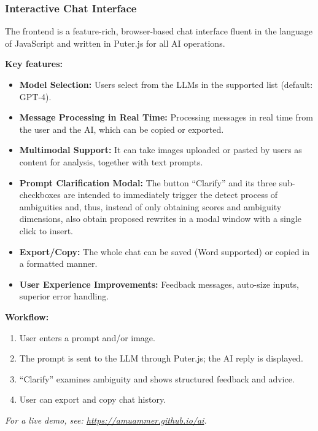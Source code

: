 \documentclass[conference]{IEEEtran}
\begin{document}
\subsubsection{Interactive Chat Interface}
The frontend is a feature-rich, browser-based chat interface fluent in the language of JavaScript and written in Puter.js for all AI operations.

\textbf{Key features:}
\begin{itemize}
    \item \textbf{Model Selection:} Users select from the LLMs in the supported list (default: GPT-4).
    \item \textbf{Message Processing in Real Time:} Processing messages in real time from the user and the AI, which can be copied or exported.
    \item \textbf{Multimodal Support:} It can take images uploaded or pasted by users as content for analysis, together with text prompts.
    \item \textbf{Prompt Clarification Modal:} The button “Clarify” and its three sub-checkboxes are intended to immediately trigger the detect process of ambiguities and, thus, instead of only obtaining scores and ambiguity dimensions, also obtain proposed rewrites in a modal window with a single click to insert.
    \item \textbf{Export/Copy:} The whole chat can be saved (Word supported) or copied in a formatted manner.
    \item \textbf{User Experience Improvements:} Feedback messages, auto-size inputs, superior error handling.
\end{itemize}

\textbf{Workflow:}
\begin{enumerate}
    \item User enters a prompt and/or image.
    \item The prompt is sent to the LLM through Puter.js; the AI reply is displayed.
    \item “Clarify” examines ambiguity and shows structured feedback and advice.
    \item User can export and copy chat history.
\end{enumerate}

\textit{For a live demo, see: \url{https://amuammer.github.io/ai}.}
\end{document}
